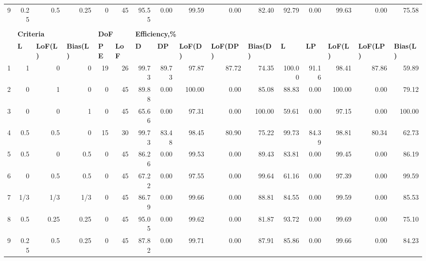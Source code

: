 \begin{landscape}
\begin{table}[p]
{\begin{tabular}{rrrrrrrrrrrrrrrr}
9 & 0.25 & 0.5 & 0.25 & \multicolumn{1}{|r}{0} & 45 & \multicolumn{1}{|r}{95.55} & 0.00 & 99.59 & 0.00 & 82.40 & \multicolumn{1}{|r}{92.79} & 0.00 & 99.63 & 0.00 & 75.58 \\
 &  &  &  &  &  &  &  &  &  &  &  &  &  &  & \\
\multicolumn{1}{l}{} & \multicolumn{3}{l}{{\bf Criteria}} & \multicolumn{2}{l}{{\bf DoF}} & \multicolumn{10}{l}{{\bf Efficiency,\%}} \\
\multicolumn{1}{l}{} & \multicolumn{1}{l}{{\bf L}} & \multicolumn{1}{l}{{\bf LoF(L)}} & \multicolumn{1}{l}{{\bf Bias(L)}} & \multicolumn{1}{l}{{\bf PE}} & \multicolumn{1}{l}{{\bf LoF}} & \multicolumn{1}{l}{{\bf D}} & \multicolumn{1}{l}{{\bf DP}} & \multicolumn{1}{l}{{\bf LoF(D)}} & \multicolumn{1}{l}{{\bf LoF(DP)}} & \multicolumn{1}{l}{{\bf Bias(D)}} & \multicolumn{1}{l}{{\bf L}} & \multicolumn{1}{l}{{\bf LP}} & \multicolumn{1}{l}{{\bf LoF(L)}} & \multicolumn{1}{l}{{\bf LoF(LP)}} & \multicolumn{1}{l}{{\bf Bias(L)}} \\
1 & 1 & 0 & 0 & \multicolumn{1}{|r}{19} & 26 & \multicolumn{1}{|r}{99.73} & 89.73 & 97.87 & 87.72 & 74.35 & \multicolumn{1}{|r}{100.00} & 91.16 & 98.41 & 87.86 & 59.89 \\
2 & 0 & 1 & 0 & \multicolumn{1}{|r}{0} & 45 & \multicolumn{1}{|r}{89.88} & 0.00 & 100.00 & 0.00 & 85.08 & \multicolumn{1}{|r}{88.83} & 0.00 & 100.00 & 0.00 & 79.12 \\
3 & 0 & 0 & 1 & \multicolumn{1}{|r}{0} & 45 & \multicolumn{1}{|r}{65.66} & 0.00 & 97.31 & 0.00 & 100.00 & \multicolumn{1}{|r}{59.61} & 0.00 & 97.15 & 0.00 & 100.00 \\
4 & 0.5 & 0.5 & 0 & \multicolumn{1}{|r}{15} & 30 & \multicolumn{1}{|r}{99.73} & 83.48 & 98.45 & 80.90 & 75.22 & \multicolumn{1}{|r}{99.73} & 84.39 & 98.81 & 80.34 & 62.73 \\
5 & 0.5 & 0 & 0.5 & \multicolumn{1}{|r}{0} & 45 & \multicolumn{1}{|r}{86.26} & 0.00 & 99.53 & 0.00 & 89.43 & \multicolumn{1}{|r}{83.81} & 0.00 & 99.45 & 0.00 & 86.19 \\
6 & 0 & 0.5 & 0.5 & \multicolumn{1}{|r}{0} & 45 & \multicolumn{1}{|r}{67.22} & 0.00 & 97.55 & 0.00 & 99.64 & \multicolumn{1}{|r}{61.16} & 0.00 & 97.39 & 0.00 & 99.59 \\
7 & 1/3 & 1/3 & 1/3 & \multicolumn{1}{|r}{0} & 45 & \multicolumn{1}{|r}{86.79} & 0.00 & 99.66 & 0.00 & 88.81 & \multicolumn{1}{|r}{84.55} & 0.00 & 99.59 & 0.00 & 85.53 \\
8 & 0.5 & 0.25 & 0.25 & \multicolumn{1}{|r}{0} & 45 & \multicolumn{1}{|r}{95.05} & 0.00 & 99.62 & 0.00 & 81.87 & \multicolumn{1}{|r}{93.72} & 0.00 & 99.69 & 0.00 & 75.10 \\
9 & 0.25 & 0.5 & 0.25 & \multicolumn{1}{|r}{0} & 45 & \multicolumn{1}{|r}{87.82} & 0.00 & 99.71 & 0.00 & 87.91 & \multicolumn{1}{|r}{85.86} & 0.00 & 99.66 & 0.00 & 84.23
\end{tabular}
}
\end{table}
\end{landscape}

